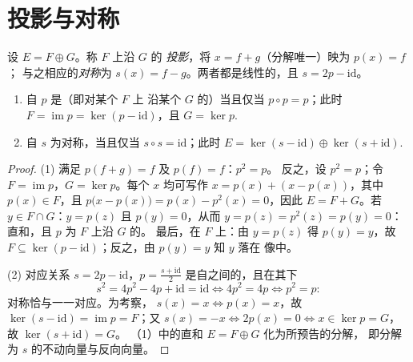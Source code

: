 \section{投影与对称}

\begin{definition}\label{def:b1:linmaps:projection}
设 $E = F \oplus G$。称 $F$ 上沿 $G$ 的
\emph{投影}，将 $x = f + g$（分解唯一）映为 $p(x) = f$；
与之相应的\emph{对称}为 $s(x)
= f - g$。两者都是线性的，且 $s = 2p - \mathrm{id}$。
\end{definition}

\begin{theorem}[代数刻画]\label{thm:b1:linmaps:projchar}
\begin{enumerate}
  \item 自 $p$ 是（即对某个 $F$ 上
        沿某个 $G$ 的）当且仅当 $p \circ p = p$；此时 $F =
        \operatorname{im} p = \ker(p - \mathrm{id})$，且 $G = \ker
        p$.
  \item 自 $s$ 为对称，当且仅当 $s \circ s
        = \mathrm{id}$；此时 $E = \ker(s - \mathrm{id}) \oplus
        \ker(s + \mathrm{id})$.
\end{enumerate}
\end{theorem}

\begin{proof}
(1) 满足 $p(f + g) = f$ 及 $p(f) = f$：$p^2 = p$。
反之，设 $p^2 = p$；令 $F = \operatorname{im} p$，$G = \ker
p$。每个 $x$ 均可写作 $x = p(x) + (x - p(x))$，其中 $p(x) \in F$，且
$p\bigl(x - p(x)\bigr) = p(x) - p^2(x) = 0$，因此 $E = F + G$。若 $y \in
F \cap G$：$y = p(z)$ 且 $p(y) = 0$，从而 $y = p(z) = p^2(z) = p(y) =
0$：直和，且 $p$ 为 $F$ 上沿 $G$ 的。
最后，在 $F$ 上：由 $y = p(z)$ 得 $p(y) = y$，故 $F \subseteq
\ker(p - \mathrm{id})$；反之，由 $p(y) = y$ 知 $y$ 落在
像中。

(2) 对应关系 $s = 2p - \mathrm{id}$，$p = \frac{s +
\mathrm{id}}2$ 是自之间的，且在其下
\[
s^2 = 4p^2 - 4p + \mathrm{id} = \mathrm{id}
\iff 4p^2 = 4p \iff p^2 = p :
\]
对称恰与一一对应。为考察，
$s(x) = x \iff p(x) = x$，故 $\ker(s - \mathrm{id}) =
\operatorname{im} p = F$；又 $s(x) = -x \iff 2p(x) = 0 \iff x
\in \ker p = G$，故 $\ker(s + \mathrm{id}) = G$。
（1）中的直和 $E = F \oplus G$ 化为所预告的分解，
即分解为 $s$ 的不动向量与反向向量。
\end{proof}


